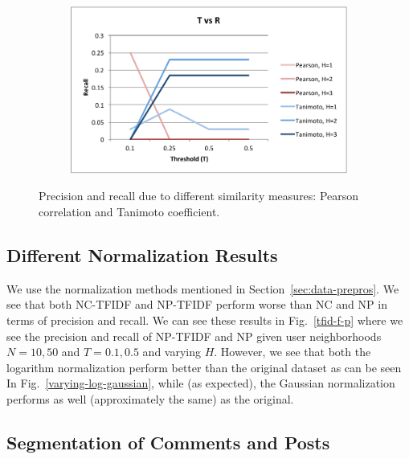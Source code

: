 \documentclass{article}
\begin{document}
\begin{figure}[h]
\begin{subfigure}{.4\textwidth}
  \label{fig:nvr}
\end{subfigure}%
\begin{subfigure}{.4\textwidth}
  \centering
  \includegraphics[width=\linewidth]{img/tvr.pdf}
  \label{fig:tvr}
\end{subfigure}
\caption{Precision and recall due to different similarity measures: Pearson correlation and
Tanimoto coefficient.}\label{fig:learning-rate-hidden-layers}
\end{figure}

\subsection{Different Normalization Results}\label{sec:different-normalization}

We use the normalization methods mentioned in Section~\ref{sec:data-prepros}. We see that both NC-TFIDF and NP-TFIDF perform worse than NC and NP in terms of precision and recall. We can see these 
results in Fig.~\ref{tfid-f-p} where we see the precision and recall of NP-TFIDF and NP given user neighborhoods
$N =10, 50$ and $T = 0.1, 0.5$ and varying $H$. However, we see that both the logarithm normalization 
perform better than the original dataset as can be seen In Fig.~\ref{varying-log-gaussian}, while (as expected), 
the Gaussian normalization performs as well (approximately the same) as the original. 
 
\subsection{Segmentation of Comments and Posts}\label{sec:set-com-posts}
\end{document}
